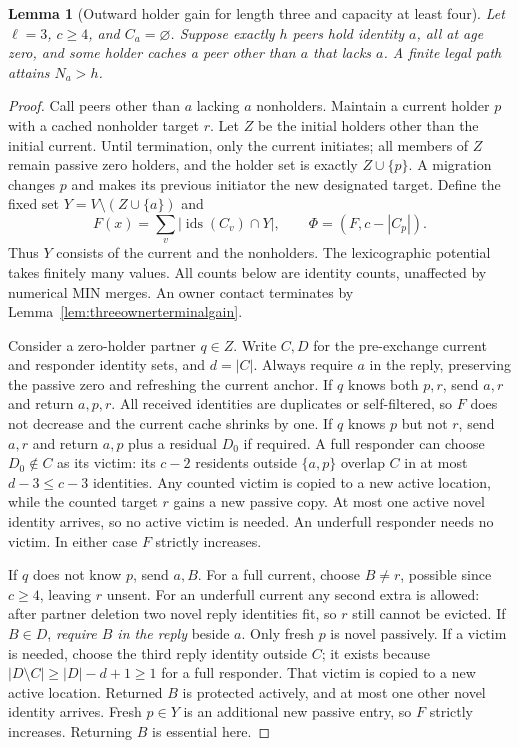 \documentclass[11pt]{article}
\newtheorem{lemma}[theorem]{Lemma}
\begin{document}
\begin{lemma}[Outward holder gain for length three and capacity at least four]
\label{lem:threesparseoutwardgain}
Let $\ell=3$, $c\ge4$, and $C_a=\varnothing$. Suppose
exactly $h$ peers hold identity $a$, all at age zero, and
some holder caches a peer other than $a$ that lacks $a$.
A finite legal path attains $N_a>h$.
\end{lemma}
\begin{proof}
Call peers other than $a$ lacking $a$ nonholders. Maintain
a current holder $p$ with a cached nonholder target $r$.
Let $Z$ be the initial holders other than the initial current.
Until termination, only the current initiates; all members of
$Z$ remain passive zero holders, and the holder set is exactly
$Z\cup\{p\}$. A migration changes $p$ and makes its previous
initiator the new designated target. Define the fixed set
$Y=V\setminus(Z\cup\{a\})$ and
\[
 F(x)=\sum_v|\operatorname{ids}(C_v)\cap Y|,\qquad
 \Phi=(F,c-|C_p|).
\]
Thus $Y$ consists of the current and the nonholders. The
lexicographic potential takes finitely many values. All counts
below are identity counts, unaffected by numerical MIN merges.
An owner contact terminates by
Lemma~\ref{lem:threeownerterminalgain}.

Consider a zero-holder partner $q\in Z$. Write $C,D$ for the
pre-exchange current and responder identity sets, and $d=|C|$.
Always require $a$ in the reply, preserving the passive zero
and refreshing the current anchor.
If $q$ knows both $p,r$, send $a,r$ and return $a,p,r$.
All received identities are duplicates or self-filtered, so
$F$ does not decrease and the current cache shrinks by one.
If $q$ knows $p$ but not $r$, send $a,r$ and return $a,p$ plus
a residual $D_0$ if required. A full responder can choose
$D_0\notin C$ as its victim: its $c-2$ residents outside
$\{a,p\}$ overlap $C$ in at most $d-3\le c-3$ identities.
Any counted victim is copied to a new active location, while
the counted target $r$ gains a new passive copy. At most one
active novel identity arrives, so no active victim is needed.
An underfull responder needs no victim. In either case $F$
strictly increases.

If $q$ does not know $p$, send $a,B$. For a full current,
choose $B\ne r$, possible since $c\ge4$, leaving $r$ unsent.
For an underfull current any second extra is allowed: after
partner deletion two novel reply identities fit, so $r$ still
cannot be evicted. If $B\in D$, \emph{require $B$ in the reply}
beside $a$. Only fresh $p$ is novel passively. If a victim is
needed, choose the third reply identity outside $C$; it exists
because $|D\setminus C|\ge |D|-d+1\ge1$ for a full responder.
That victim is copied to a new active location. Returned $B$
is protected actively, and at most one other novel identity
arrives. Fresh $p\in Y$ is an additional new passive entry,
so $F$ strictly increases. Returning $B$ is essential here.


\end{proof}
\end{document}
